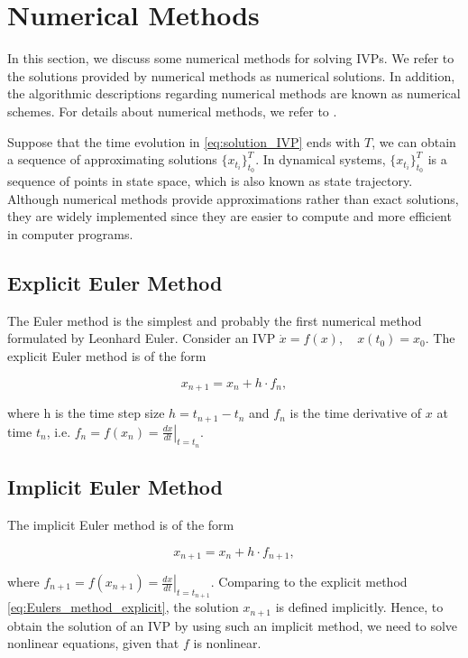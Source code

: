 \documentclass[
	parskip, 			   %
	twoside, 			   %
	DIV=14, 			   %
	BCOR=15.0mm, 		   %
	headsepline, 		   %
	open=right, 		   %
	captions=tableheading, %
	bibliography=totoc,    %
	numbers=noenddot       %
]{scrreprt}
\begin{document}
\clearpage
\section{Numerical Methods}
In this section, we discuss some numerical methods for solving IVPs. We refer to the solutions provided by numerical methods as numerical solutions. In addition, the algorithmic descriptions regarding numerical methods are known as numerical schemes. For details about numerical methods, we refer to \cite{hairer2006geometric}.

Suppose that the time evolution in \ref{eq:solution_IVP} ends with $T$, we can obtain a sequence of approximating solutions $ \{ x_{t_{i}} \}_{t_{0}}^{T}$. In dynamical systems, $ \{ x_{t_{i}} \}_{t_{0}}^{T}$ is a sequence of points in state space, which is also known as state trajectory. Although numerical methods provide approximations rather than exact solutions, they are widely implemented since they are easier to compute and more efficient in computer programs. 

\subsection{Explicit Euler Method}
The Euler method is the simplest and probably the first numerical method formulated by Leonhard Euler. Consider an IVP $\dot{x} = f(x), \quad x(t_{0})=x_{0}$. The explicit Euler method is of the form

\begin{equation}
    \label{eq:Eulers_method_explicit}
    x_{n+1} = x_{n} + h \cdot f_{n},
\end{equation}

where h is the time step size $h = t_{n+1} - t_{n}$ and $f_{n}$ is the time derivative of $x$ at time $t_{n}$, i.e. $f_{n} = f(x_n) = \left. \frac{dx}{dt} \right|_{t=t_n}$.

\subsection{Implicit Euler Method}
The implicit Euler method is of the form

\begin{equation}
    \label{eq:Eulers_method_implicit}
    x_{n+1} = x_{n} + h \cdot f_{n+1},
\end{equation}

where $f_{n+1} = f(x_{n+1}) = \left. \frac{dx}{dt} \right|_{t=t_{n+1}}$. Comparing to the explicit method \ref{eq:Eulers_method_explicit}, the solution $x_{n+1}$ is defined implicitly. Hence, to obtain the solution of an IVP by using such an implicit method, we need to solve nonlinear equations, given that $f$ is nonlinear.
\end{document}
